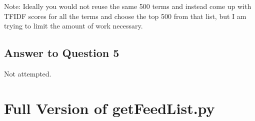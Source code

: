 \documentclass{article}
\begin{document}
Note: Ideally you would not reuse the same 500 terms and instead come up with TFIDF scores for all the terms and choose the top 500 from that list, but I am trying to limit the amount of work necessary.

\subsection*{Answer to Question 5}

Not attempted.






\newpage
\appendix

\section{Full Version of getFeedList.py}
\end{document}
